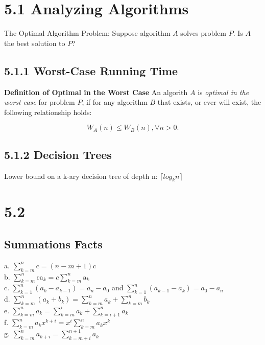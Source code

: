 \documentclass[10pt,twocolumn]{article}
\begin{document}
	\section*{5.1 Analyzing Algorithms}
	
	The Optimal Algorithm Problem: Suppose algorithm $A$ solves problem $P$. Is $A$ the best solution to $P$?
	
	\subsection*{5.1.1 Worst-Case Running Time}
	
	\textbf{Definition of Optimal in the Worst Case} An algorith $A$ is \emph{optimal in the worst case} for problem $P$, if for any algorithm $B$ that exists, or ever will exist, the following relationship holds:
	
	\[W_A(n)\leq W_B(n),\forall n>0.\]
	
	\subsection*{5.1.2 Decision Trees}
	
	Lower bound on a k-ary decision tree of depth n: $\lceil log_k n\rceil$
	

	\section*{5.2}
	
	\subsection*{Summations Facts}
	a. $\displaystyle \sum_{k=m}^n \mathrm{c} = (n - m + 1)\mathrm{c}$ \\
	b. $\displaystyle \sum_{k=m}^n \mathrm{c a_\mathit{k}} = c
	\displaystyle\sum_{k=m}^n \mathrm{a_\mathit{k}}$\\
	c. $\displaystyle\sum_{k=1}^n (a_\mathit{k} - a_\mathit{k - 1}) =
	a_\mathit{n} - a_\mathit{0}$ and $ \displaystyle\sum_{k=1}^n
	(a_\mathit{k - 1} - a_\mathit{k}) = a_\mathit{0} - a_\mathit{n}$\\
	d. $\displaystyle\sum_{k=m}^n (a_\mathit{k} + b_\mathit{k}) =
	\displaystyle\sum_{k=m}^n a_\mathit{k} + \displaystyle\sum_{k=m}^n
	b_\mathit{k}$\\
	e. $\displaystyle\sum_{k=m}^n a_\mathit{k} = \displaystyle\sum_{k=m}^i
	a_\mathit{k} +  \displaystyle\sum_{k=i+1}^n a_\mathit{k}$\\
	f. $\displaystyle\sum_{k=m}^n a_\mathit{k}x^\mathit{k+i} = 
	x^\mathit{i} \sum_{k=m}^n a_\mathit{k}x^\mathit{k}$\\
	g. $\displaystyle\sum_{k=m}^n a_\mathit{k+i} = \displaystyle\sum_{k=m+i}^{n+1}
	a_\mathit{k}$\\
\end{document}
